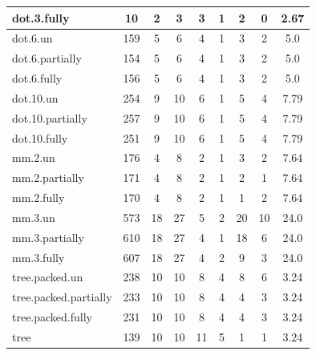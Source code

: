 \begin{table}
\begin{tabular}{lcccccccc}
    dot.3.fully & 10 & 2 & 3 & 3 & 1 & 2 & 0 & 2.67\\
    \midrule
    dot.6.un & 159 & 5 & 6 & 4 & 1 & 3 & 2 & 5.0\\
    dot.6.partially & 154 & 5 & 6 & 4 & 1 & 3 & 2 & 5.0\\
    dot.6.fully & 156 & 5 & 6 & 4 & 1 & 3 & 2 & 5.0\\
    \midrule
    dot.10.un & 254 & 9 & 10 & 6 & 1 & 5 & 4 & 7.79\\
    dot.10.partially & 257 & 9 & 10 & 6 & 1 & 5 & 4 & 7.79\\
    dot.10.fully & 251 & 9 & 10 & 6 & 1 & 5 & 4 & 7.79\\
    \midrule
    mm.2.un & 176 & 4 & 8 & 2 & 1 & 3 & 2 & 7.64\\
    mm.2.partially & 171 & 4 & 8 & 2 & 1 & 2 & 1 & 7.64\\
    mm.2.fully & 170 & 4 & 8 & 2 & 1 & 1 & 2 & 7.64\\
    \midrule
    mm.3.un & 573 & 18 & 27 & 5 & 2 & 20 & 10 & 24.0\\
    mm.3.partially & 610 & 18 & 27 & 4 & 1 & 18 & 6 & 24.0\\
    mm.3.fully & 607 & 18 & 27 & 4 & 2 & 9 & 3 & 24.0\\
    \midrule
    tree.packed.un & 238 & 10 & 10 & 8 & 4 & 8 & 6 & 3.24\\
    tree.packed.partially & 233 & 10 & 10 & 8 & 4 & 4 & 3 & 3.24\\
    tree.packed.fully & 231 & 10 & 10 & 8 & 4 & 4 & 3 & 3.24\\
    tree & 139 & 10 & 10 & 11 & 5 & 1 & 1 & 3.24\\\bottomrule
    \end{tabular}
\end{table}


